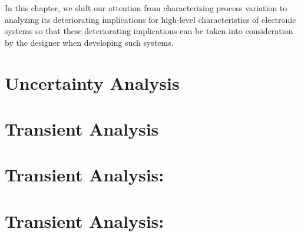In this chapter, we shift our attention from characterizing process variation to
analyzing its deteriorating implications for high-level characteristics of
electronic systems so that these deteriorating implications can be taken into
consideration by the designer when developing such systems.

\section{\introductiontitle}

\section{\motivationtitle}

\section{\problemtitle}

\section{\priortitle}

\section{\solutiontitle}

\section{Uncertainty Analysis}

\section{Transient Analysis}

\section{Transient Analysis: \applicationtitle}

\section{Transient Analysis: \resultstitle}

